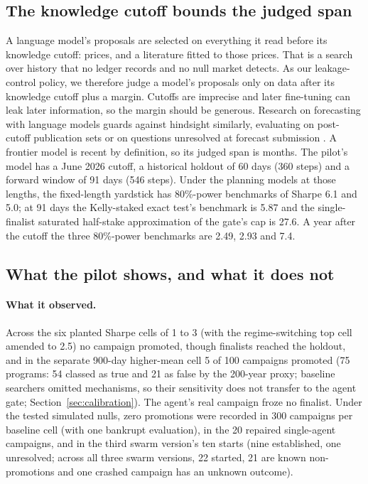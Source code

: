 \documentclass[11pt]{article}
\begin{document}
\subsection{The knowledge cutoff bounds the judged span}\label{sec:cutoff}

A language model's proposals are selected on everything it read before its knowledge cutoff: prices, and a literature fitted to those prices. That is a search over history that no ledger records and no null market detects. As our leakage-control policy, we therefore judge a model's proposals only on data after its knowledge cutoff plus a margin. Cutoffs are imprecise and later fine-tuning can leak later information, so the margin should be generous. Research on forecasting with language models guards against hindsight similarly, evaluating on post-cutoff publication sets \cite{halawi2024} or on questions unresolved at forecast submission \cite{karger2025}. A frontier model is recent by definition, so its judged span is months. The pilot's model has a June 2026 cutoff, a historical holdout of 60 days (360 steps) and a forward window of 91 days (546 steps). Under the planning models at those lengths, the fixed-length yardstick has 80\%-power benchmarks of Sharpe 6.1 and 5.0; at 91 days the Kelly-staked exact test's benchmark is 5.87 and the single-finalist saturated half-stake approximation of the gate's cap is 27.6. A year after the cutoff the three 80\%-power benchmarks are 2.49, 2.93 and 7.4.

\subsection{What the pilot shows, and what it does not}

\paragraph{What it observed.} Across the six planted Sharpe cells of 1 to 3 (with the regime-switching top cell amended to 2.5) no campaign promoted, though finalists reached the holdout, and in the separate 900-day higher-mean cell 5 of 100 campaigns promoted (75 programs: 54 classed as true and 21 as false by the 200-year proxy; baseline searchers omitted mechanisms, so their sensitivity does not transfer to the agent gate; Section~\ref{sec:calibration}). The agent's real campaign froze no finalist. Under the tested simulated nulls, zero promotions were recorded in 300 campaigns per baseline cell (with one bankrupt evaluation), in the 20 repaired single-agent campaigns, and in the third swarm version's ten starts (nine established, one unresolved; across all three swarm versions, 22 started, 21 are known non-promotions and one crashed campaign has an unknown outcome).
\end{document}
